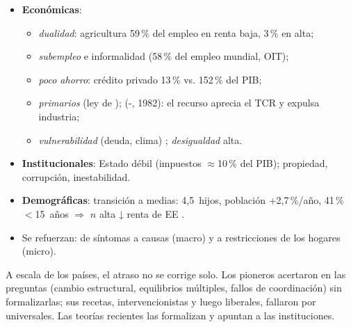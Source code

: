 \documentclass{article}
\begin{document}
\begin{columnas}
\begin{itemize}
\item \textbf{Económicas}:
  \begin{itemize}
  \item \emph{dualidad}: agricultura 59\,\% del empleo en renta baja, 3\,\% en alta;
  \item \emph{subempleo} e informalidad (58\,\% del empleo mundial, OIT);
  \item \emph{poco ahorro}: crédito privado 13\,\% vs. 152\,\% del PIB;
  \item \emph{primarios} (ley de );  (-, 1982): el recurso aprecia el TCR y expulsa industria;
  \item \emph{vulnerabilidad} (deuda, clima)  ; \emph{desigualdad} alta.
  \end{itemize}
\item \textbf{Institucionales}: Estado débil (impuestos $\approx$10\,\% del PIB); propiedad, corrupción, inestabilidad.
\item \textbf{Demográficas}: transición a medias: 4,5~hijos, población +2,7\,\%/año, 41\,\% $<$15~años $\Rightarrow$ $n$ alta ↓ renta de EE .
\item Se refuerzan: de síntomas a causas (macro) y a restricciones de los hogares (micro).
\end{itemize}

\begin{ideaclave}
A escala de los países, el atraso no se corrige solo. Los pioneros acertaron en las preguntas (cambio estructural, equilibrios múltiples, fallos de coordinación) sin formalizarlas; sus recetas, intervencionistas y luego liberales, fallaron por universales. Las teorías recientes las formalizan y apuntan a las instituciones.
\end{ideaclave}


\end{columnas}
\end{document}
